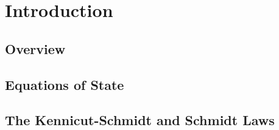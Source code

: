 \chapter{Introduction}

\section{Overview}


\section{Equations of State}


\section{The Kennicut-Schmidt and Schmidt Laws}

